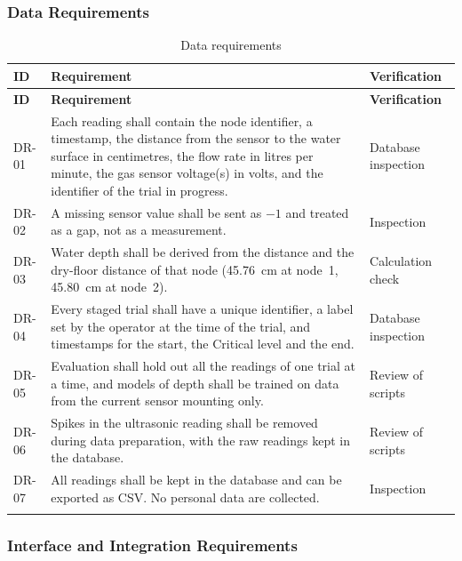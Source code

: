 \documentclass[12pt, a4paper]{article}
\begin{document}
\subsubsection{Data Requirements}

\begin{longtable}{|p{1.4cm}|p{9.4cm}|p{2.5cm}|}
\hline
\textbf{ID} & \textbf{Requirement} & \textbf{Verification} \\
\hline
\endfirsthead
\hline
\textbf{ID} & \textbf{Requirement} & \textbf{Verification} \\
\hline
\endhead
DR-01 & Each reading shall contain the node identifier, a timestamp, the distance from the sensor to the water surface in centimetres, the flow rate in litres per minute, the gas sensor voltage(s) in volts, and the identifier of the trial in progress. & Database inspection \\
\hline
DR-02 & A missing sensor value shall be sent as $-1$ and treated as a gap, not as a measurement. & Inspection \\
\hline
DR-03 & Water depth shall be derived from the distance and the dry-floor distance of that node (45.76~cm at node~1, 45.80~cm at node~2). & Calculation check \\
\hline
DR-04 & Every staged trial shall have a unique identifier, a label set by the operator at the time of the trial, and timestamps for the start, the Critical level and the end. & Database inspection \\
\hline
DR-05 & Evaluation shall hold out all the readings of one trial at a time, and models of depth shall be trained on data from the current sensor mounting only. & Review of scripts \\
\hline
DR-06 & Spikes in the ultrasonic reading shall be removed during data preparation, with the raw readings kept in the database. & Review of scripts \\
\hline
DR-07 & All readings shall be kept in the database and can be exported as CSV. No personal data are collected. & Inspection \\
\hline
\caption{Data requirements}\label{tab:dr}\\
\end{longtable}

\subsubsection{Interface and Integration Requirements}
\end{document}
